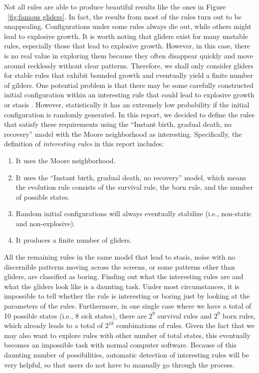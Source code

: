 \documentclass[12pt]{article}
\numberwithin{figure}{section} %
\begin{document}
Not all rules are able to produce beautiful results like the ones in Figure ~\ref{fig:famous gliders}. In fact, the results from most of the rules turn out to be unappealing. Configurations under some rules always die out, while others might lead to explosive growth. It is worth noting that gliders exist for many unstable rules, especially those that lead to explosive growth. However, in this case, there is no real value in exploring them because they often disappear quickly and move around recklessly without clear patterns. Therefore, we shall only consider gliders for stable rules that exhibit bounded growth and eventually yield a finite number of gilders. One potential problem is that there may be some carefully constructed initial configuration within an interesting rule that could lead to explosive growth or stasis \cite{Gliders in Cellular Automata}. However, statistically it has an extremely low probability if the initial configuration is randomly generated. In this report, we decided to define the rules that satisfy these requirements using the “Instant birth, gradual death, no recovery” model with the Moore neighborhood as interesting. Specifically, the definition of \textit{interesting rules} in this report includes: 
\begin{enumerate}[topsep=0pt,itemsep=-1ex,partopsep=1ex,parsep=1ex]
\item It uses the Moore neighborhood. 
\item It uses the “Instant birth, gradual death, no recovery” model, which means the evolution rule consists of the survival rule, the born rule, and the number of possible states. 
\item Random initial configurations will always eventually stabilize (i.e., non-static and non-explosive). 
\item It produces a finite number of gliders. 
\end{enumerate}

All the remaining rules in the same model that lead to stasis, noise with no discernible patterns moving across the screens, or some patterns other than gliders, are classified as boring. Finding out what the interesting rules are and what the gliders look like is a daunting task. Under most circumstances, it is impossible to tell whether the rule is interesting or boring just by looking at the parameters of the rules. Furthermore, in one single case where we have a total of 10 possible states (i.e., 8 sick states), there are $2^9$ survival rules and $2^9$ born rules, which already leads to a total of $2^{18}$ combinations of rules. Given the fact that we may also want to explore rules with other number of total states, this eventually becomes an impossible task with normal computer software. Because of this daunting number of possibilities, automatic detection of interesting rules will be very helpful, so that users do not have to manually go through the process. 
\end{document}

